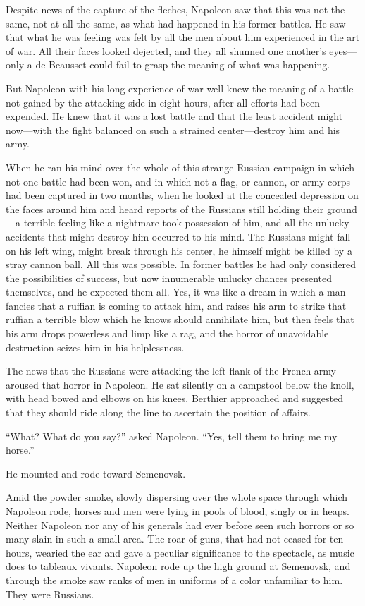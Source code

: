 Despite news of the capture of the fleches, Napoleon saw that
this was not the same, not at all the same, as what had happened
in his former battles. He saw that what he was feeling was felt
by all the men about him experienced in the art of war. All their
faces looked dejected, and they all shunned one another's
eyes---only a de Beausset could fail to grasp the meaning of what
was happening.

But Napoleon with his long experience of war well knew the
meaning of a battle not gained by the attacking side in eight
hours, after all efforts had been expended. He knew that it was a
lost battle and that the least accident might now---with the
fight balanced on such a strained center---destroy him and his
army.

When he ran his mind over the whole of this strange Russian
campaign in which not one battle had been won, and in which not a
flag, or cannon, or army corps had been captured in two months,
when he looked at the concealed depression on the faces around
him and heard reports of the Russians still holding their
ground---a terrible feeling like a nightmare took possession of
him, and all the unlucky accidents that might destroy him
occurred to his mind. The Russians might fall on his left wing,
might break through his center, he himself might be killed by a
stray cannon ball. All this was possible. In former battles he
had only considered the possibilities of success, but now
innumerable unlucky chances presented themselves, and he expected
them all. Yes, it was like a dream in which a man fancies that a
ruffian is coming to attack him, and raises his arm to strike
that ruffian a terrible blow which he knows should annihilate
him, but then feels that his arm drops powerless and limp like a
rag, and the horror of unavoidable destruction seizes him in his
helplessness.

The news that the Russians were attacking the left flank of the
French army aroused that horror in Napoleon. He sat silently on a
campstool below the knoll, with head bowed and elbows on his
knees. Berthier approached and suggested that they should ride
along the line to ascertain the position of affairs.

``What? What do you say?'' asked Napoleon. ``Yes, tell them to
bring me my horse.''

He mounted and rode toward Semenovsk.

Amid the powder smoke, slowly dispersing over the whole space
through which Napoleon rode, horses and men were lying in pools
of blood, singly or in heaps. Neither Napoleon nor any of his
generals had ever before seen such horrors or so many slain in
such a small area. The roar of guns, that had not ceased for ten
hours, wearied the ear and gave a peculiar significance to the
spectacle, as music does to tableaux vivants. Napoleon rode up
the high ground at Semenovsk, and through the smoke saw ranks of
men in uniforms of a color unfamiliar to him. They were Russians.

